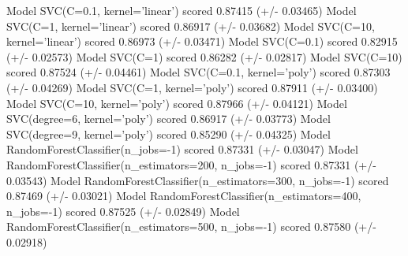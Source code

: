 \documentclass{article}
\begin{document}
Model SVC(C=0.1, kernel='linear') scored 0.87415 (+/- 0.03465)
Model SVC(C=1, kernel='linear') scored 0.86917 (+/- 0.03682)
Model SVC(C=10, kernel='linear') scored 0.86973 (+/- 0.03471)
Model SVC(C=0.1) scored 0.82915 (+/- 0.02573)
Model SVC(C=1) scored 0.86282 (+/- 0.02817)
Model SVC(C=10) scored 0.87524 (+/- 0.04461)
Model SVC(C=0.1, kernel='poly') scored 0.87303 (+/- 0.04269)
Model SVC(C=1, kernel='poly') scored 0.87911 (+/- 0.03400)
Model SVC(C=10, kernel='poly') scored 0.87966 (+/- 0.04121)
Model SVC(degree=6, kernel='poly') scored 0.86917 (+/- 0.03773)
Model SVC(degree=9, kernel='poly') scored 0.85290 (+/- 0.04325)
Model RandomForestClassifier(n_jobs=-1) scored 0.87331 (+/- 0.03047)
Model RandomForestClassifier(n_estimators=200, n_jobs=-1) scored 0.87331 (+/- 0.03543)
Model RandomForestClassifier(n_estimators=300, n_jobs=-1) scored 0.87469 (+/- 0.03021)
Model RandomForestClassifier(n_estimators=400, n_jobs=-1) scored 0.87525 (+/- 0.02849)
Model RandomForestClassifier(n_estimators=500, n_jobs=-1) scored 0.87580 (+/- 0.02918)

\fi
\end{document}
